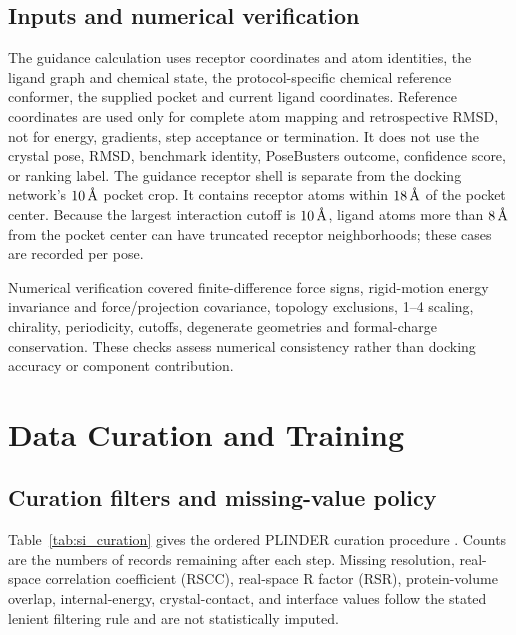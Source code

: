 \documentclass{article}
\newcommand{\angstrom}{\text{\normalfont\AA}}
\newcommand{\citep}[1]{\cite{#1}}
\begin{document}
\subsection{Inputs and numerical verification}
\label{si:guidance_provenance}

The guidance calculation uses receptor coordinates and atom identities, the ligand graph and chemical state, the protocol-specific chemical reference conformer, the supplied pocket and current ligand coordinates. Reference coordinates are used only for complete atom mapping and retrospective RMSD, not for energy, gradients, step acceptance or termination.
It does not use the crystal pose, RMSD, benchmark identity, PoseBusters outcome, confidence score, or ranking label.
The guidance receptor shell is separate from the docking network's \(10\,\angstrom\) pocket crop.
It contains receptor atoms within \(18\,\angstrom\) of the pocket center.
Because the largest interaction cutoff is \(10\,\angstrom\), ligand atoms more than \(8\,\angstrom\) from the pocket center can have truncated receptor neighborhoods; these cases are recorded per pose.

Numerical verification covered finite-difference force signs, rigid-motion energy invariance and force/projection covariance, topology exclusions, 1--4 scaling, chirality, periodicity, cutoffs, degenerate geometries and formal-charge conservation. These checks assess numerical consistency rather than docking accuracy or component contribution.

\section{Data Curation and Training}
\label{si:data_provenance}

\subsection{Curation filters and missing-value policy}

Table~\ref{tab:si_curation} gives the ordered PLINDER curation procedure \citep{durairaj2024plinder}.
Counts are the numbers of records remaining after each step.
Missing resolution, real-space correlation coefficient (RSCC), real-space R factor (RSR), protein-volume overlap, internal-energy, crystal-contact, and interface values follow the stated lenient filtering rule and are not statistically imputed.
\end{document}
